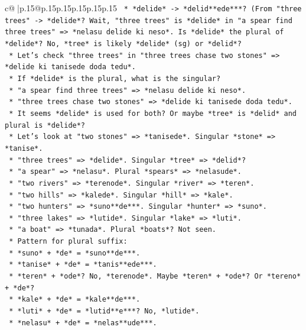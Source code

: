 \documentclass{article}
\begin{document}
{\begin{supertabular}{c@{$\;$}|p{.15\linewidth}@{}p{.15\linewidth}p{.15\linewidth}p{.15\linewidth}p{.15\linewidth}p{.15\linewidth}}
{{{\texttt{        *   *delide* {-}> *delid**ede***? (From "three trees" {-}> *delide*? Wait, "three trees" is *delide* in "a spear find three trees" => *nelasu delide ki neso*. Is *delide* the plural of *delide*? No, *tree* is likely *delide* (sg) or *delid*?} \\
\texttt{        *   Let's check "three trees" in "three trees chase two stones" => *delide ki tanisede doda tedu*.} \\
\texttt{        *   If *delide* is the plural, what is the singular?} \\
\texttt{        *   "a spear find three trees" => *nelasu delide ki neso*.} \\
\texttt{        *   "three trees chase two stones" => *delide ki tanisede doda tedu*.} \\
\texttt{        *   It seems *delide* is used for both? Or maybe *tree* is *delid* and plural is *delide*?} \\
\texttt{        *   Let's look at "two stones" => *tanisede*. Singular *stone* => *tanise*.} \\
\texttt{        *   "three trees" => *delide*. Singular *tree* => *delid*?} \\
\texttt{        *   "a spear" => *nelasu*. Plural *spears* => *nelasude*.} \\
\texttt{        *   "two rivers" => *terenode*. Singular *river* => *teren*.} \\
\texttt{        *   "two hills" => *kalede*. Singular *hill* => *kale*.} \\
\texttt{        *   "two hunters" => *suno**de***. Singular *hunter* => *suno*.} \\
\texttt{        *   "three lakes" => *lutide*. Singular *lake* => *luti*.} \\
\texttt{        *   "a boat" => *tunada*. Plural *boats*? Not seen.} \\
\texttt{        *   Pattern for plural suffix:} \\
\texttt{            *   *suno* + *de* = *suno**de***.} \\
\texttt{            *   *tanise* + *de* = *tanis**ede***.} \\
\texttt{            *   *teren* + *ode*? No, *terenode*. Maybe *teren* + *ode*? Or *tereno* + *de*?} \\
\texttt{            *   *kale* + *de* = *kale**de***.} \\
\texttt{            *   *luti* + *de* = *lutid**e***? No, *lutide*.} \\
\texttt{            *   *nelasu* + *de* = *nelas**ude***.} \\
}}}
\end{supertabular}}
\end{document}
